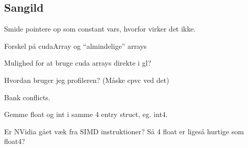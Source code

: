 \subsection*{Sangild}

Smide pointere op som constant vars, hvorfor virker det ikke.

Forskel på cudaArray og ``almindelige'' arrays

Mulighed for at bruge cuda arrays direkte i gl?

Hvordan bruger jeg profileren? (Måske cpvc ved det)

Bank conflicts.

Gemme float og int i samme 4 entry struct, eg. int4.

Er NVidia gået væk fra SIMD instruktioner? Så 4 float er ligeså
hurtige som float4?
